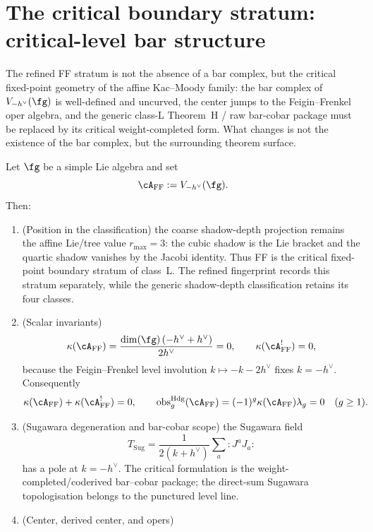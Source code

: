 \section{The critical boundary stratum: critical-level bar structure}
\label{sec:FF-bar-structure}

The refined FF stratum is not the absence of a bar complex, but the
critical fixed-point geometry of the affine Kac--Moody family: the bar
complex of~$V_{-h^\vee}(\fg)$ is well-defined and uncurved, the center
jumps to the Feigin--Frenkel oper algebra, and the generic class-L
Theorem~H / raw bar-cobar package must be replaced by its critical
weight-completed form. What changes is not the existence of the bar
complex, but the surrounding theorem surface.

\begin{theorem}
\label{thm:fifth-class-FF}
Let $\fg$ be a simple Lie algebra and set
\[
\cA_{\mathrm{FF}} := V_{-h^\vee}(\fg).
\]
Then:
\begin{enumerate}[label=\textup{(\roman*)},leftmargin=*]
\item \textup{(}Position in the classification\textup{)}
 the coarse shadow-depth projection remains the affine
 Lie/tree value $r_{\max}=3$: the cubic shadow is the Lie bracket and
 the quartic shadow vanishes by the Jacobi identity. Thus FF is the
 critical fixed-point boundary stratum of class~L. The refined
 fingerprint records this stratum separately, while the generic
 shadow-depth classification retains its four classes.
\item \textup{(}Scalar invariants\textup{)}
 \[
 \kappa(\cA_{\mathrm{FF}})
 = \frac{\dim(\fg)\,(-h^\vee+h^\vee)}{2h^\vee}
 = 0,
 \qquad
 \kappa(\cA_{\mathrm{FF}}^{!}) = 0,
 \]
 because the Feigin--Frenkel level involution
 $k \mapsto -k-2h^\vee$ fixes $k=-h^\vee$. Consequently
 \[
 \kappa(\cA_{\mathrm{FF}}) + \kappa(\cA_{\mathrm{FF}}^{!}) = 0,
 \qquad
 \operatorname{obs}^{\mathrm{Hdg}}_g(\cA_{\mathrm{FF}})
 =(-1)^g\kappa(\cA_{\mathrm{FF}})\lambda_g = 0
 \quad (g \ge 1).
 \]
\item \textup{(}Sugawara degeneration and bar-cobar scope\textup{)}
 the Sugawara field
 \[
 T_{\mathrm{Sug}}
 = \frac{1}{2(k+h^\vee)}\sum_a {:}J^aJ_a{:}
 \]
 has a pole at $k=-h^\vee$. The critical formulation is the
 weight-completed/coderived bar--cobar package; the direct-sum
 Sugawara topologisation belongs to the punctured level line.
\item \textup{(}Center, derived center, and opers\textup{)}

\end{enumerate}
\end{theorem}
